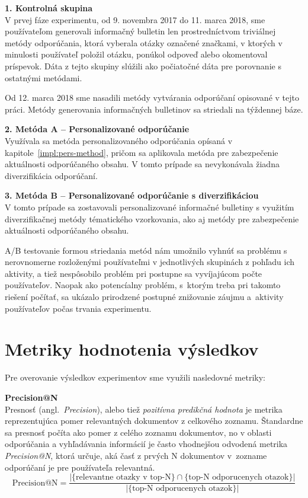 \begin{adjustwidth}{1cm}{1cm}
\textbf{1. Kontrolná skupina}\\
V prvej fáze experimentu, od 9. novembra 2017 do 11. marca 2018, sme používateľom generovali informačný bulletin len
prostredníctvom triviálnej metódy odporúčania, ktorá vyberala otázky označené značkami, v ktorých v minulosti používateľ
položil otázku, ponúkol odpoveď alebo okomentoval príspevok. Dáta z tejto skupiny slúžili ako počiatočné dáta pre porovnanie
s ostatnými metódami.

Od 12. marca 2018 sme nasadili metódy vytvárania odporúčaní opisované v tejto práci. Metódy generovania informačných bulletinov
sa striedali na týždennej báze.

\textbf{2. Metóda A -- Personalizované odporúčanie}\\
Využívala sa metóda personalizovaného odporúčania opísaná v kapitole~\ref{impl:pers-method}, pričom sa aplikovala
metóda pre zabezpečenie aktuálnosti odporúčaného obsahu. V tomto prípade sa nevykonávala žiadna diverzifikácia odporúčaní.

\textbf{3. Metóda B -- Personalizované odporúčanie s diverzifikáciou}\\
V tomto prípade sa zostavovali personalizované informačné bulletiny s využitím diverzifikačnej metódy tématického
vzorkovania, ako aj metódy pre zabezpečenie aktuálnosti odporúčaného obsahu.
\end{adjustwidth}

A/B testovanie formou striedania metód nám umožnilo vyhnúť sa problému s nerovnomerne rozloženými používateľmi v jednotlivých
skupinách z pohľadu ich aktivity, a tiež nespôsobilo problém pri postupne sa vyvíjajúcom počte používateľov.
Naopak ako potencíalny problém, s~ktorým treba pri takomto riešení počítať, sa ukázalo prirodzené postupné znižovanie
záujmu a~aktivity používateľov počas trvania experimentu.


\section{Metriky hodnotenia výsledkov}

Pre overovanie výsledkov experimentov sme využili nasledovné metriky:

\textbf{Precision@N}\\
Presnosť (angl.~\emph{Precision}), alebo tiež \textit{pozitívna predikčná hodnota} je metrika reprezentujúca pomer relevantných
dokumentov z celkového zoznamu. Štandardne sa presnosť počíta ako pomer z celého zoznamu dokumentov, no v oblasti
odporúčania a vyhľadávania informácií je často vhodnejšou odvodená metrika \textit{Precision@N}, ktorá určuje, aká časť
z prvých N dokumentov v~zozname odporúčaní je pre používateľa relevantná.
$$\mbox{Precision@N}=\frac{|\{\mbox{relevantne otazky v top-N}\}\cap\{\mbox{top-N odporucenych otazok}\}|}
{|\{\mbox{top-N odporucenych otazok}\}|}$$

